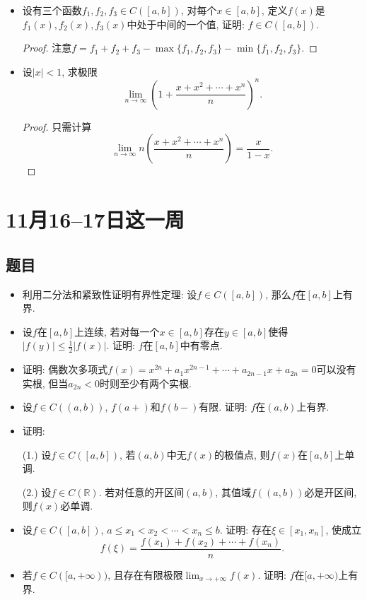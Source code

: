 \documentclass[UTF8,11pt, a4paper, oneside, fontset=none]{ctexbook}
\begin{document}
\begin{itemize}
\item[(6)] 
设有三个函数$f_1, f_2, f_3 \in C([a, b])$, 对每个$x \in [a, b]$, 定义$f(x)$是$f_1(x), f_2(x), f_3(x)$中处于中间的一个值, 证明: $f \in C([a, b])$.

\begin{proof}

注意$f = f_1 + f_2 + f_3 - \max\{ f_1, f_2, f_3\} - \min\{ f_1, f_2, f_3\}$.

\end{proof}


\item[(7)] 设$|x| <1$, 求极限
\[
\lim_{n \to \infty} \left( 1+ \frac{x + x^2 + \cdots +x^n}{n} \right)^n.
\]


\begin{proof}


只需计算
\[
\lim_{n \to \infty} n\left( \frac{x + x^2 + \cdots +x^n}{n} \right) = \frac{x}{1-x}.
\]


\end{proof}


\end{itemize}

\clearpage

\section{11月16--17日这一周}

\subsection*{题目}

\begin{itemize}
\item[(1)] 利用二分法和紧致性证明有界性定理: 设$f \in C([a, b])$, 那么$f$在$[a, b]$上有界.

\item[(2)] 设$f$在$[a, b]$上连续, 若对每一个$x \in [a, b]$存在$y \in [a, b]$使得$|f(y)| \leq \frac{1}{2}|f(x)|$. 证明: $f$在$[a, b]$中有零点.

\item[(3)] 证明: 偶数次多项式$f(x) = x^{2n} + a_1 x^{2n-1} + \cdots + a_{2n-1} x + a_{2n} = 0$可以没有实根, 但当$a_{2n}<0$时则至少有两个实根.

\item[(4)] 设$f \in C((a, b))$, $f(a+)$和$f(b-)$有限. 证明: $f$在$(a, b)$上有界.

\item[(5)] 证明:

(1.) 设$f \in C([a, b])$, 若$(a, b)$中无$f(x)$的极值点, 则$f(x)$在$[a, b]$上单调.

(2.) 设$f \in C(\mathbb R)$. 若对任意的开区间$(a, b)$, 其值域$f((a, b))$必是开区间, 则$f(x)$必单调.

\item[(6)] 设$f \in C([a, b])$, $a \leq x_1 < x_2 < \cdots <x_n \leq b$. 证明: 存在$\xi \in [x_1, x_n]$, 使成立
\[
f(\xi) = \frac{f(x_1) + f(x_2) + \cdots + f(x_n)}{n}.
\]

\item[(7)] 若$f \in C([a, +\infty))$, 且存在有限极限$\lim_{x \to +\infty}f(x)$. 证明: $f$在$[a, +\infty)$上有界.
\end{itemize}
\end{document}
